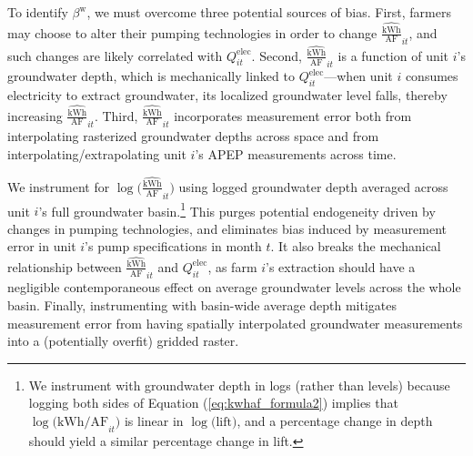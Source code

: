 To identify $\beta^{\text{w}}$, we must overcome three  potential sources of bias. First, farmers may choose to alter their pumping technologies in order to change $\widehat{\tfrac{{\text{kWh}}}{\text{AF}}}_{it}$, and such changes are likely correlated with $Q^{\text{elec}}_{it}$. Second, $\widehat{\tfrac{{\text{kWh}}}{\text{AF}}}_{it}$ is a function of unit $i$'s groundwater depth, which is mechanically linked to $Q^{\text{elec}}_{it}$---when unit $i$ consumes electricity to extract groundwater, its localized groundwater level falls, thereby increasing $\widehat{\tfrac{{\text{kWh}}}{\text{AF}}}_{it}$. Third, $\widehat{\tfrac{{\text{kWh}}}{\text{AF}}}_{it}$ incorporates measurement error both from interpolating rasterized groundwater depths across space and from interpolating/extrapolating unit $i$'s APEP measurements across time.

We instrument for $\log\big(\widehat{\tfrac{{\text{kWh}}}{\text{AF}}}_{it}\big)$ using logged groundwater depth averaged across unit $i$'s full groundwater basin.\footnote{
We instrument with groundwater depth in logs (rather than levels) because logging both sides of Equation (\ref{eq:kwhaf_formula2}) implies that $\log\big({{\text{kWh}}\big/{\text{AF}}}_{it}\big)$ is linear in $\log\big(\text{lift}\big)$, and a percentage change in depth should yield a similar percentage change in lift.
} This purges potential endogeneity driven by changes in pumping technologies, and eliminates bias induced by measurement error in unit $i$'s pump specifications in month $t$. It also breaks the mechanical relationship between $\widehat{\tfrac{{\text{kWh}}}{\text{AF}}}_{it}$ and $Q^{\text{elec}}_{it}$, as farm $i$'s extraction should have a negligible contemporaneous effect on average groundwater levels across the whole basin. Finally, instrumenting with basin-wide average depth mitigates measurement error from having spatially interpolated groundwater measurements into a (potentially overfit) gridded raster.

